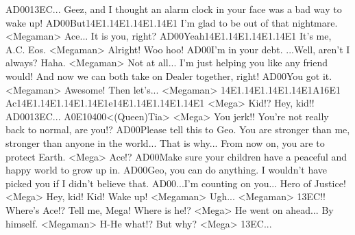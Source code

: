 {AD}{00}{13}{EC}... 
Geez, and I thought an alarm clock in your face was a bad way to wake up! 
{AD}{00}But{14}{E1}.{14}{E1}.{14}{E1}.{14}{E1} I'm glad to be out of that nightmare. 
<Megaman> Ace... 
It is you, right? 
{AD}{00}Yeah{14}{E1}.{14}{E1}.{14}{E1}.{14}{E1} It's me, A.C. Eos. 
<Megaman> Alright! Woo hoo! 
{AD}{00}I'm in your debt. 
...Well, aren't I always? Haha. 
<Megaman> Not at all... 
I'm just helping you like any friend would! 
And now we can both take on Dealer together, right! 
{AD}{00}You got it. 
<Megaman> Awesome! 
Then let's... 
<Megaman> {14}{E1}.{14}{E1}.{14}{E1}.{14}{E1}A{16}{E1} Ac{14}{E1}.{14}{E1}.{14}{E1}.{14}{E1}e{14}{E1}.{14}{E1}.{14}{E1}.{14}{E1} 
<Mega> Kid!? Hey, kid!! 
{AD}{00}{13}{EC}... 
{A0}{E1}{04}{00}<(Queen)Tia> 
<Mega> You jerk!! 
You're not really back to normal, are you!? 
{AD}{00}Please tell this to Geo. 
You are stronger than me, stronger than anyone in the world... 
That is why... 
From now on, you are to protect Earth. 
<Mega> Ace!? 
{AD}{00}Make sure your children have a peaceful and happy world to grow up in. 
{AD}{00}Geo, you can do anything. 
I wouldn't have picked you if I didn't believe that. 
{AD}{00}...I'm counting on you... Hero of Justice! 
<Mega> Hey, kid! 
Kid! Wake up! 
<Megaman> Ugh... 
<Megaman> {13}{EC}!! 
Where's Ace!? 
Tell me, Mega! Where is he!? 
<Mega> He went on ahead... 
By himself. 
<Megaman> H-He what!? 
But why? 
<Mega> {13}{EC}... 
